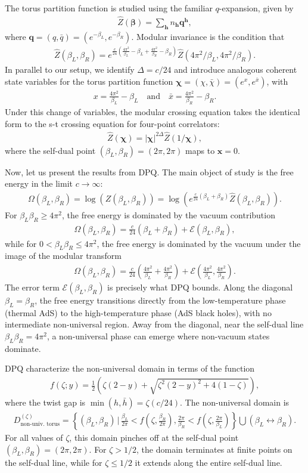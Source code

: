\documentclass[a4paper,11pt]{article}
\theoremstyle{plain}
\theoremstyle{definition}
\theoremstyle{remark}
\newcommand{\bs}[1]{\boldsymbol{#1}}
\newcommand{\bh}{{\bar{h}}}
\newcommand{\ba}{\begin{equation} \begin{aligned}}
\newcommand{\ea}{\end{aligned} \end{equation}}
\newcommand{\De}{\Delta}
\begin{document}
The torus partition function is studied using the familiar $q$-expansion, given by
\ba
\widehat{Z}(\bs{\beta}) = \sum_{\bs{h}} n_{\bs{h}} \bs{q}^{\bs{h}},
\ea
where $\bs{q} = (q,\bar{q}) = (e^{-\beta_L},e^{-\beta_R})$. Modular invariance is the condition that
\ba
\widehat{Z}(\beta_L,\beta_R) = e^{\frac{c}{24}\left( \frac{4\pi^2}{\beta_L} - \beta_L + \frac{4\pi^2}{\beta_R} - \beta_R \right)}\widehat{Z}(4\pi^2/\beta_L, 4\pi^2/\beta_R).
\ea
In parallel to our setup, we identify $\De = c/24$ and introduce analogous coherent state variables for the torus partition function $\bs{\chi} = (\chi,\bar{\chi}) = (e^x, e^{\bar{x}})$, with
\ba
x = \frac{4\pi^2}{\beta_L} - \beta_L \quad \text{and} \quad \bar{x} = \frac{4\pi^2}{\beta_R} - \beta_R.
\label{cohstatetorus}
\ea
Under this change of variables, the modular crossing equation takes the identical form to the s-t crossing equation for four-point correlators:
\ba
\widehat{Z}(\bs{\chi}) = |\bs{\chi}|^{2\De} \widehat{Z}(1/\bs{\chi}),
\ea
where the self-dual point $(\beta_L,\beta_R) = (2\pi,2\pi)$ maps to $\bs{x} = 0$. 

Now, let us present the results from DPQ. The main object of study is the free energy in the limit $c \to \infty$:
\ba
\Omega(\beta_L,\beta_R) = \log\left(Z(\beta_L,\beta_R)\right) = \log\left(e^{\frac{c}{24}(\beta_L + \beta_R)} \widehat{Z}(\beta_L,\beta_R)\right).
\ea
For $\beta_L \beta_R \geq 4\pi^2$, the free energy is dominated by the vacuum contribution
\ba
\Omega(\beta_L,\beta_R) = \frac{c}{24}(\beta_L + \beta_R) + \mathcal{E}(\beta_L,\beta_R),
\ea
while for $0 < \beta_L \beta_R \leq 4\pi^2$, the free energy is dominated by the vacuum under the image of the modular transform
\ba
\Omega(\beta_L,\beta_R) = \frac{c}{24}\left(\frac{4\pi^2}{\beta_L} + \frac{4\pi^2}{\beta_R}\right) + \mathcal{E}\left(\frac{4\pi^2}{\beta_L}, \frac{4\pi^2}{\beta_R}\right).
\ea
The error term $\mathcal{E}(\beta_L,\beta_R)$ is precisely what DPQ bounds. Along the diagonal $\beta_L = \beta_R$, the free energy transitions directly from the low-temperature phase (thermal AdS) to the high-temperature phase (AdS black holes), with no intermediate non-universal region. Away from the diagonal, near the self-dual line $\beta_L \beta_R = 4\pi^2$, a non-universal phase can emerge where non-vacuum states dominate.

DPQ characterize the non-universal domain in terms of the function
\ba
f(\zeta; y) = \frac{1}{2}\left(\zeta(2-y) + \sqrt{\zeta^2(2-y)^2 + 4(1-\zeta)}\right),
\ea
where the twist gap is $\min(h,\bh) = \zeta (c/24)$. The non-universal domain is
\ba
D^{(\zeta)}_{\text{non-univ.~torus}} = \left\{(\beta_L,\beta_R) \,\Bigg|\, \frac{\beta_L}{2\pi} < f\left(\zeta, \frac{\beta_R}{2\pi}\right), \frac{2\pi}{\beta_R} < f\left(\zeta, \frac{2\pi}{\beta_L}\right)\right\} \bigcup (\beta_L \leftrightarrow \beta_R).
\ea
For all values of $\zeta$, this domain pinches off at the self-dual point $(\beta_L,\beta_R) = (2\pi,2\pi)$. For $\zeta > 1/2$, the domain terminates at finite points on the self-dual line, while for $\zeta \leq 1/2$ it extends along the entire self-dual line.
\end{document}
